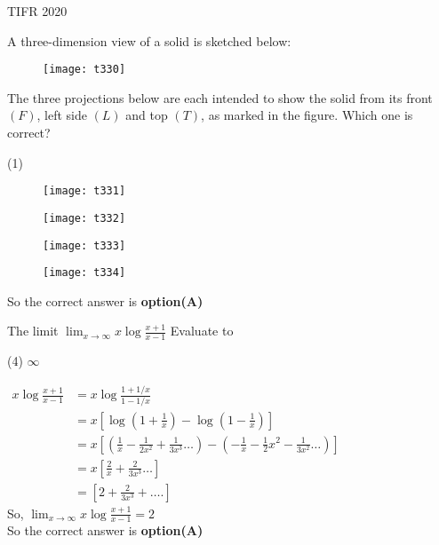 \begin{abox}
TIFR 2020
\end{abox}
\begin{questions}
\begin{minipage}{\textwidth}
	\question A three-dimension view of a solid is sketched below:\\
	\begin{figure}[H]
		\centering
		\texttt{[image: t330]}
	\end{figure}
	The three projections below are each intended to show the solid from its front $(F)$, left side $(L)$ and top $(T)$, as marked in the figure. Which one is correct?
\end{minipage}
\begin{tasks}(1)
	\task[\textbf{A.}] \begin{figure}[H]
		\centering
		\texttt{[image: t331]}
	\end{figure}
	\task[\textbf{B.}] \begin{figure}[H]
		\centering
		\texttt{[image: t332]}
	\end{figure}
	\task[\textbf{C.}] \begin{figure}[H]
		\centering
		\texttt{[image: t333]}
	\end{figure}
	\task[\textbf{D.}] \begin{figure}[H]
		\centering
		\texttt{[image: t334]}
	\end{figure}
\end{tasks}
\begin{answer}
	So the correct answer is \textbf{option(A)}
\end{answer}
\begin{minipage}{\textwidth}
	\question The limit $\lim _{x \rightarrow \infty} x \log \frac{x+1}{x-1}$
	Evaluate to
\end{minipage}
\begin{tasks}(4)
	\task[\textbf{C.}] $\infty$
\end{tasks}
\begin{answer}$\left. \right. $\\
	$\begin{aligned} x \log \frac{x+1}{x-1} &=x \log \frac{1+1 / x}{1-1 / x} \\ &=x\left[\log \left(1+\frac{1}{x}\right)-\log \left(1-\frac{1}{x}\right)\right] \\ &=x\left[\left(\frac{1}{x}-\frac{1}{2 x^{2}}+\frac{1}{3 x^{3}} \ldots\right)-\left(-\frac{1}{x}-\frac{1}{2} x^{2}-\frac{1}{3 x^{2}} \ldots\right)\right] \\ &=x\left[\frac{2}{x}+\frac{2}{3 x^{3}} \ldots\right] \\ &=\left[2+\frac{2}{3 x^{3}}+\ldots .\right] \end{aligned}$\\
	So, $\lim _{x \rightarrow \infty} x \log \frac{x+1}{x-1}=2$\\
	So the correct answer is \textbf{option(A)}
	

\end{answer}
\end{questions}
